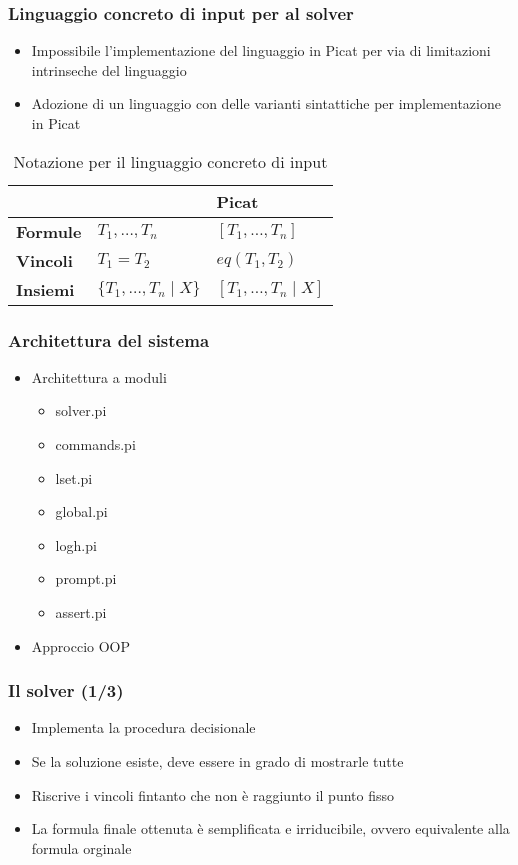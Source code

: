 \documentclass{beamer}
\begin{document}
\begin{frame}
  \frametitle{Linguaggio concreto di input per al solver}
  \begin{itemize}
  	\item Impossibile l'implementazione del linguaggio \lset{} in Picat per via di limitazioni intrinseche del linguaggio
  	\item Adozione di un linguaggio con delle varianti sintattiche per implementazione in Picat
  \end{itemize}
  \begin{table}
    \begin{tabular}{l l l}
      \toprule
        & \textbf{\lset{}} & \textbf{Picat}\\
      \midrule
      \textbf{Formule} & $T_1, \ldots, T_n$ & $[T_1, \ldots, T_n]$ \\
      \textbf{Vincoli} & $T_1 = T_2$ & $eq(T_1, T_2)$ \\
      \textbf{Insiemi} & $\{T_1, \ldots, T_n \mid X\}$ & $[T_1, \ldots, T_n \mid X]$ \\
      \bottomrule
    \end{tabular}
  \caption{Notazione per il linguaggio concreto di input}
  \end{table}
\end{frame}


\begin{frame}
  \frametitle{Architettura del sistema}
  \begin{itemize}
    \item Architettura a moduli
    \begin{itemize}
      \item solver.pi
      \item commands.pi
      \item lset.pi
      \item global.pi
      \item log\textunderscore h.pi
      \item prompt.pi
      \item assert.pi
    \end{itemize}
	\item Approccio OOP
  \end{itemize}
\end{frame}


\begin{frame}
	\frametitle{Il solver (1/3)}
	\begin{itemize}
		\item Implementa la procedura decisionale \satset{}
		\item Se la soluzione esiste, deve essere in grado di mostrarle tutte
		\item Riscrive i vincoli fintanto che non è raggiunto il punto fisso
		\item La formula finale ottenuta è semplificata e irriducibile, ovvero equivalente alla formula orginale
	\end{itemize}
\end{frame}
\end{document}
